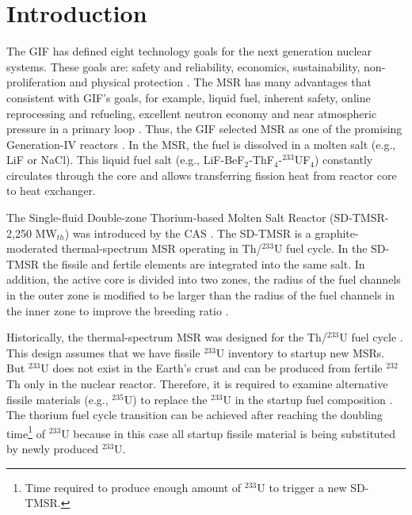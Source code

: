 \section{Introduction}
The \gls{GIF} has defined eight technology goals for the next generation 
nuclear systems. These goals are: safety and reliability, economics, 
sustainability, non-proliferation and physical protection 
\cite{doe2002technology}. The \gls{MSR} has many advantages that consistent 
with \gls{GIF}'s goals, for example, liquid fuel, inherent safety, online 
reprocessing and refueling, excellent neutron economy and near atmospheric 
pressure in a primary loop \cite{siemer2015molten,rosenthal1970molten}. 
Thus, the \gls{GIF} selected \gls{MSR} as one of the promising Generation-IV 
reactors \cite{doe2002technology,pioro2016handbook}.
In the \gls{MSR}, the fuel is dissolved in a molten salt (e.g., LiF or NaCl). 
This liquid fuel salt (e.g., LiF-BeF$_2$-ThF$_4$-$^{233}$UF$_4$) constantly 
circulates through the core and allows transferring fission heat from reactor 
core to heat exchanger. 
 
The Single-fluid Double-zone Thorium-based Molten Salt Reactor (SD-TMSR-2,250 
MW$_{th}$) was introduced by the \gls{CAS} \cite{li_optimization_2018}. The 
SD-TMSR 
is a graphite-moderated thermal-spectrum \gls{MSR} operating in Th/$^{233}$U 
fuel cycle. In the SD-TMSR the fissile and fertile elements are integrated 
into the same salt. In addition, the active core is divided into two zones, 
the radius of the fuel channels in the outer zone is modified to be larger 
than the radius of the fuel channels in the inner zone to improve the breeding 
ratio \cite{nuttin2005potential,li_optimization_2018}.

Historically, the thermal-spectrum \gls{MSR} was designed for the Th/$^{233}$U 
fuel cycle \cite{rykhlevskii2019modeling,nuttin2005potential,
merle2004scenarios,rosenthal1970molten}. This design assumes that we have 
fissile $^{233}$U inventory to startup new \glspl{MSR}. But $^{233}$U does not 
exist in the Earth's crust and can be produced from fertile $^{232}$Th only in 
the nuclear reactor. Therefore, it is required to examine alternative fissile 
materials (e.g., $^{235}$U) to replace the $^{233}$U in the startup fuel 
composition \cite{betzler2016modeling,zou2018transition}. The thorium fuel 
cycle transition can be achieved after reaching the doubling 
time\footnote{Time required to produce enough amount of $^{233}$U to trigger a 
new SD-TMSR.} of $^{233}$U because in this case all startup fissile material 
is being substituted by newly produced $^{233}$U.

